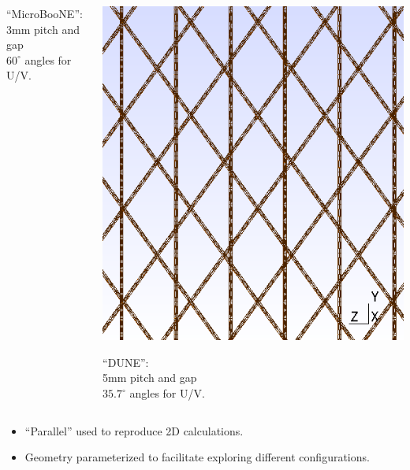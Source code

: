 \documentclass[xcolor=dvipsnames]{beamer}
\begin{document}
\begin{frame}
\begin{columns}
\begin{column}{0.3\textwidth}
\begin{center}
        ``MicroBooNE'':\\3mm pitch and gap\\$60^\circ$ angles for U/V.
      \end{center}
    \end{column}
    \begin{column}{0.3\textwidth}
      \begin{center}
        \includegraphics[height=0.4\textheight]{dune-mesh.png}      

        ``DUNE'':\\5mm pitch and gap\\$35.7^\circ$ angles for U/V.
      \end{center}
    \end{column}
  \end{columns}

  \vspace{4mm}

  \begin{itemize}
  \item ``Parallel'' used to reproduce 2D calculations. 
  \item Geometry parameterized to facilitate exploring different configurations.
  \end{itemize}

\end{frame}
\end{document}
